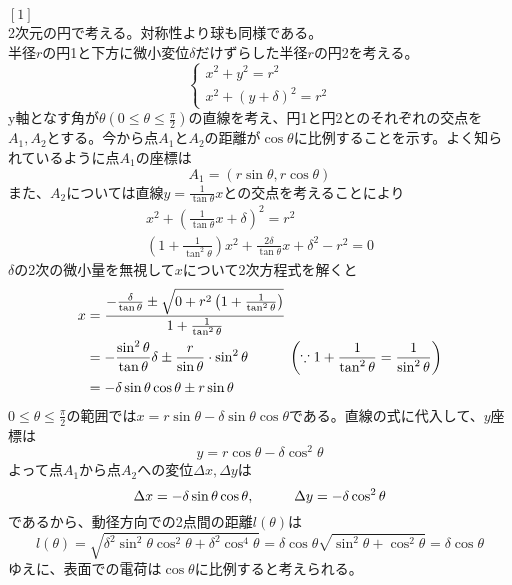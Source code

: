 \documentclass{jsarticle}
\begin{document}
\newpage
\noindent
\([1]\)\\
2次元の円で考える。対称性より球も同様である。\\
半径\(r\)の円1と下方に微小変位\(\delta\)だけずらした半径\(r\)の円2を考える。
\begin{equation*}
\begin{cases}
x^{2}+y^{2}=r^{2}\\
x^{2}+(y+\delta)^{2}=r^{2}\end{cases}
\end{equation*}
y軸となす角が\(\theta(0\leq\theta\leq\frac{\pi}{2})\)の直線を考え、円1と円2とのそれぞれの交点を\(A_{1},A_{2}\)とする。今から点\(A_{1}\)と\(A_{2}\)の距離が\(\cos\theta\)に比例することを示す。よく知られているように点\(A_{1}\)の座標は
\[A_{1}=(r\sin\theta,r\cos\theta)\]
また、\(A_{2}\)については直線\(y=\frac{1}{\tan\theta}x\)との交点を考えることにより
\begin{align*}
x^{2}+\left(\frac{1}{\tan\theta}x+\delta\right)^{2}=r^{2}\\
\left(1+\frac{1}{\tan^{2}\theta}\right)x^{2}+\frac{2\delta}{\tan\theta}x+\delta^{2}-r^{2}=0
\end{align*}
\(\delta\)の2次の微小量を無視して\(x\)について2次方程式を解くと
\begin{align*}
x&=\frac{-\frac{\delta}{\tan\theta}\pm\sqrt{0+r^{2}\left(1+\frac{1}{\tan^{2}\theta}\right)}}{1+\frac{1}{\tan^{2}\theta}}\\
&=-\frac{\sin^{2}\theta}{\tan\theta}\delta\pm\frac{r}{\sin\theta}\cdot\sin^{2}\theta\hspace{10mm}\left(\because1+\frac{1}{\tan^{2}\theta}=\frac{1}{\sin^{2}\theta}\right)\\
&=-\delta\sin\theta\cos\theta\pm r\sin\theta
\end{align*}
\(0\leq\theta\leq\frac{\pi}{2}\)の範囲では\(x=r\sin\theta-\delta\sin\theta\cos\theta\)である。直線の式に代入して、\(y\)座標は
\[y=r\cos\theta-\delta\cos^{2}\theta\]
よって点\(A_{1}\)から点\(A_{2}\)への変位\(\Delta x,\Delta y\)は
\[\Delta x=-\delta\sin\theta\cos\theta,\hspace{10mm}\Delta y=-\delta\cos^{2}\theta\]
であるから、動径方向での2点間の距離\(l(\theta)\)は
\[l(\theta)=\sqrt{\delta^{2}\sin^{2}\theta\cos^{2}\theta+\delta^{2}\cos^{4}\theta}=\delta\cos\theta\sqrt{\sin^{2}\theta+\cos^{2}\theta}=\delta\cos\theta\]
ゆえに、表面での電荷は\(\cos\theta\)に比例すると考えられる。\\
\\


\newpage
\end{document}
